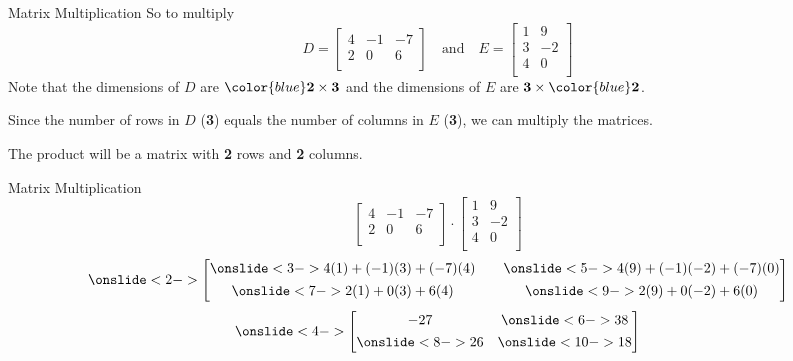 \documentclass[t]{beamer}
\begin{document}
\begin{frame}{Matrix Multiplication}
So to multiply 
\[
D =
\begin{bmatrix}
4   &   -1  &   -7 \\
2   &   0   &   6   \\
\end{bmatrix}
\quad   \text{and}  \quad
E =
\begin{bmatrix}
1   &   9   \\
3   &   -2  \\
4   &   0   \\
\end{bmatrix}
\]
\pause 
Note that the dimensions of $D$ are ${\color{blue}\textbf{2}} \times \mathbf{3}$ and the dimensions of $E$ are $\mathbf{3} \times {\color{blue}\textbf{2}}$. \newline\\
\pause

Since the number of rows in $D$ (\textbf{3}) equals the number of columns in $E$ (\textbf{3}), we can multiply the matrices. \newline\\ \pause

The product will be a matrix with {\color{blue}\textbf{2}} rows and {\color{blue}\textbf{2}} columns. 
\end{frame}

\begin{frame}{Matrix Multiplication}
\[ 
\begin{bmatrix}
4 & -1 & -7 \\
2	&	0	&	6 \\
\end{bmatrix}  \cdot
\begin{bmatrix}
1	&	9	\\
3	&	-2	\\
4	&	0	\\
\end{bmatrix}
\]
\vspace{10pt}
\[
\onslide<2->{
\begin{bmatrix}
\onslide<3->{4(1) + (-1)(3) + (-7)(4)}	\quad &	\onslide<5->{4(9) + (-1)(-2) + (-7)(0)} 	\\[4pt]
\onslide<7->{2(1) + 0(3) + 6(4)}	\quad &	\onslide<9->{2(9) + 0(-2) + 6(0)}	\\
\end{bmatrix} }
\]
\vspace{10pt}
\[
\onslide<4->{
\begin{bmatrix}
-27 						& \onslide<6->{38}	\\[4pt] 
\onslide<8->{26}	&	\onslide<10->{18}\\
\end{bmatrix} }
\]
\end{frame}
\end{document}
